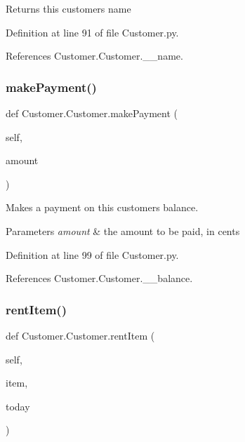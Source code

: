 \begin{DoxyReturn}{Returns}
this customer\textquotesingle{}s name 
\end{DoxyReturn}


Definition at line 91 of file Customer.\+py.



References Customer.\+Customer.\+\_\+\+\_\+name.

\mbox{\label{classCustomer_1_1Customer_a87070bd1a552dd094365dc4464253a3a}} 
\subsubsection{\texorpdfstring{make\+Payment()}{makePayment()}}
{\footnotesize\ttfamily def Customer.\+Customer.\+make\+Payment (\begin{DoxyParamCaption}\item[{}]{self,  }\item[{}]{amount }\end{DoxyParamCaption})}



Makes a payment on this customer\textquotesingle{}s balance. 


\begin{DoxyParams}{Parameters}
{\em amount} & the amount to be paid, in cents \\
\hline
\end{DoxyParams}


Definition at line 99 of file Customer.\+py.



References Customer.\+Customer.\+\_\+\+\_\+balance.

\mbox{\label{classCustomer_1_1Customer_aeda8ba0748ed02a22582207d04d90d62}} 
\subsubsection{\texorpdfstring{rent\+Item()}{rentItem()}}
{\footnotesize\ttfamily def Customer.\+Customer.\+rent\+Item (\begin{DoxyParamCaption}\item[{}]{self,  }\item[{}]{item,  }\item[{}]{today }\end{DoxyParamCaption})}



